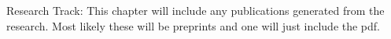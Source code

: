 

Research Track:  
This chapter will include any publications generated from the research.  Most likely these will be preprints and one will just include the pdf.

%

